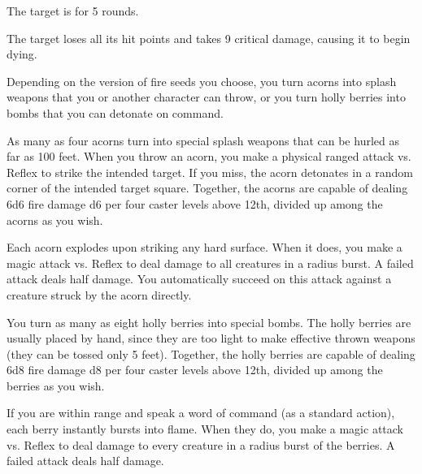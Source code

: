 \spellrng{\rngclose}
\begin{spellhealthy}
  The target is \staggered for 5 rounds.
\end{spellhealthy}
\begin{spellblood}
  The target loses all its hit points and takes 9 critical damage, causing it to begin dying.
\end{spellblood}

\spellrng{\rngtouch}
\begin{spelleffect}
  Depending on the version of fire seeds you choose, you turn acorns into splash weapons that you or another character can throw, or you turn holly berries into bombs that you can detonate on command.
  \par {} As many as four acorns turn into special splash weapons that can be hurled as far as 100 feet. When you throw an acorn, you make a physical ranged attack vs. Reflex to strike the intended target. If you miss, the acorn detonates in a random corner of the intended target square. Together, the acorns are capable of dealing 6d6 fire damage \add d6 per four caster levels above 12th, divided up among the acorns as you wish.
  \par Each acorn explodes upon striking any hard surface. When it does, you make a magic attack vs. Reflex to deal damage to all creatures in a \areasmall radius burst. A failed attack deals half damage. You automatically succeed on this attack against a creature struck by the acorn directly.
  \par {} You turn as many as eight holly berries into special bombs. The holly berries are usually placed by hand, since they are too light to make effective thrown weapons (they can be tossed only 5 feet). Together, the holly berries are capable of dealing 6d8 fire damage \add d8 per four caster levels above 12th, divided up among the berries as you wish.
  \par If you are within \rngmed range and speak a word of command (as a standard action), each berry instantly bursts into flame. When they do, you make a magic attack vs. Reflex to deal damage to every creature in a \areamed radius burst of the berries. A failed attack deals half damage.
\end{spelleffect}

